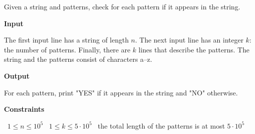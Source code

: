 Given a string and patterns, check for each pattern if it appears in the string.

\vspace{0.3cm}\noindent\textbf{Input}

The first input line has a string of length $n$.
The next input line has an integer $k$: the number of patterns. Finally, there are $k$ lines that describe the patterns.
The string and the patterns consist of characters a–z.

\vspace{0.3cm}\noindent\textbf{Output}

For each pattern, print "YES" if it appears in the string and "NO" otherwise.

\vspace{0.3cm}\noindent\textbf{Constraints}

\textbullet\ $1 \le n \le 10^5$
\textbullet\ $1 \le k \le 5 \cdot 10^5$
\textbullet\ the total length of the patterns is at most $5 \cdot 10^5$